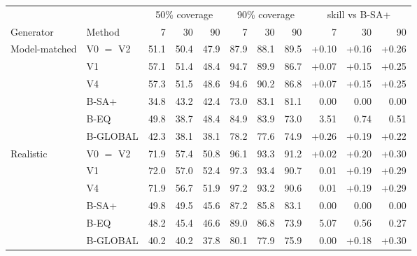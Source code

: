 \begin{tabular}{ll rrr rrr rrr}
\toprule
 & & \multicolumn{3}{c}{50\% coverage} & \multicolumn{3}{c}{90\% coverage} & \multicolumn{3}{c}{skill vs B-SA+}\\
\cmidrule(lr){3-5}\cmidrule(lr){6-8}\cmidrule(lr){9-11}
Generator & Method & 7 & 30 & 90 & 7 & 30 & 90 & 7 & 30 & 90\\
\midrule
Model-matched & V0 $=$ V2 & 51.1 & 50.4 & 47.9 & 87.9 & 88.1 & 89.5 & +0.10 & +0.16 & +0.26 \\
 & V1 & 57.1 & 51.4 & 48.4 & 94.7 & 89.9 & 86.7 & +0.07 & +0.15 & +0.25 \\
 & V4 & 57.3 & 51.5 & 48.6 & 94.6 & 90.2 & 86.8 & +0.07 & +0.15 & +0.25 \\
 & B-SA+ & 34.8 & 43.2 & 42.4 & 73.0 & 83.1 & 81.1 & 0.00 & 0.00 & 0.00 \\
 & B-EQ & 49.8 & 38.7 & 48.4 & 84.9 & 83.9 & 73.0 & \textminus{}3.51 & \textminus{}0.74 & \textminus{}0.51 \\
 & B-GLOBAL & 42.3 & 38.1 & 38.1 & 78.2 & 77.6 & 74.9 & +0.26 & +0.19 & +0.22 \\
\midrule
Realistic & V0 $=$ V2 & 71.9 & 57.4 & 50.8 & 96.1 & 93.3 & 91.2 & +0.02 & +0.20 & +0.30 \\
 & V1 & 72.0 & 57.0 & 52.4 & 97.3 & 93.4 & 90.7 & \textminus{}0.01 & +0.19 & +0.29 \\
 & V4 & 71.9 & 56.7 & 51.9 & 97.2 & 93.2 & 90.6 & \textminus{}0.01 & +0.19 & +0.29 \\
 & B-SA+ & 49.8 & 49.5 & 45.6 & 87.2 & 85.8 & 83.1 & 0.00 & 0.00 & 0.00 \\
 & B-EQ & 48.2 & 45.4 & 46.6 & 89.0 & 86.8 & 73.9 & \textminus{}5.07 & \textminus{}0.56 & \textminus{}0.27 \\
 & B-GLOBAL & 40.2 & 40.2 & 37.8 & 80.1 & 77.9 & 75.9 & 0.00 & +0.18 & +0.30 \\
\bottomrule
\end{tabular}
